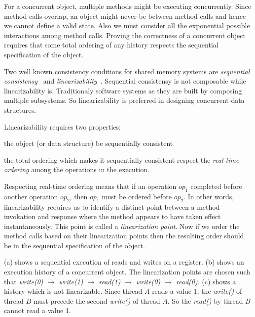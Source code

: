 For a concurrent object, multiple methods might be executing concurrently. Since method calls overlap, an object might never be between method calls and hence we cannot define a valid state. Also we must consider all the exponential possible interactions among method calls. Proving the correctness of  a concurrent object requires that some total ordering of any history respects the sequential specification of the object.

Two well known consistency conditions for shared memory systems are \emph{sequential consistensy}~\cite{Lamport:1979} and \emph{linearizability}~\cite{HerWin:1990:TOPLAS}. Sequential consistensy is not composable while linearizability is. Traditionaly software systems as they are built by composing multiple subsystems. So linearizability is preferred in designing concurrent data structures.

Linearizability requires two properties:
\begin{enumerate*}[label=(\roman*)]
\item the object (or data structure) be sequentially consistent
\item the total ordering which makes it sequentially consistent respect the \emph{real-time ordering} among the operations in the execution.
\end{enumerate*}
Respecting real-time ordering means that if an operation $op_1$ completed before another operation $op_2$, then $op_1$ must be ordered before $op_2$. In other words, linearizability  requires us to identify a distinct point between a method invokation and response where the method appears to have taken effect instantaneously. This point is called a \emph{linearization point}. Now if we order the method calls based on their linearization points then the resulting order should be in the sequential specification of the object.



(a) shows a sequential execution of reads and writes on a register. (b) shows an execution history of a concurrent object. The linearization points are chosen such that \textit{write(0) $\rightarrow$ write(1) $\rightarrow$ read(1) $\rightarrow$ write(0) $\rightarrow$ read(0)}. (c) shows a history which is not linearizable. Since thread $A$ reads a value 1, the \textit{write()} of thread $B$ must precede the second \textit{write()} of thread $A$. So the \textit{read()} by thread $B$ cannot read a value 1.

